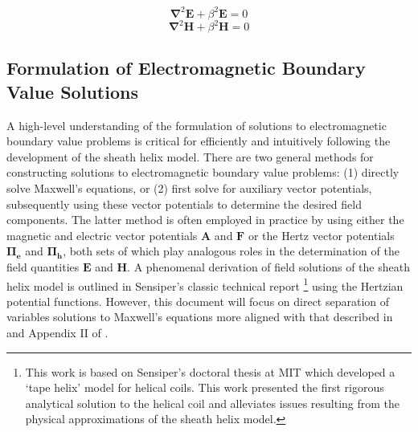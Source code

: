 \begin{equation}\label{eq:EwaveLossless}
	\mathbf{\nabla}^2\mathbf{E} + \beta^2 \mathbf{E} = 0
\end{equation}
\begin{equation}\label{eq:HwaveLossless}
	\mathbf{\nabla}^2\mathbf{H} + \beta^2 \mathbf{H} = 0
\end{equation}

\subsection{Formulation of Electromagnetic Boundary Value Solutions}\label{subsec:bvp}
A high-level understanding of the formulation of solutions to electromagnetic boundary value problems is critical for efficiently and intuitively following the development of the sheath helix model. There are two general methods for constructing solutions to electromagnetic boundary value problems: (1) directly solve Maxwell's equations, or (2) first solve for auxiliary vector potentials, subsequently using these vector potentials to determine the desired field components. The latter method is often employed in practice by using either the magnetic and electric vector potentials $\mathbf{A}$ and $\mathbf{F}$ or the Hertz vector potentials $\mathbf{\Pi_e}$ and $\mathbf{\Pi_h}$, both sets of which play analogous roles in the determination of the field quantities $\mathbf{E}$ and $\mathbf{H}$. A phenomenal derivation of field solutions of the sheath helix model is outlined in Sensiper's classic technical report \cite{sensiper_thesis}\footnote{This work is based on Sensiper's doctoral thesis at MIT which developed a `tape helix' model for helical coils. This work presented the first rigorous analytical solution to the helical coil and alleviates issues resulting from the physical approximations of the sheath helix model.} using the Hertzian potential functions. However, this document will focus on direct separation of variables solutions to Maxwell's equations more aligned with that described in \cite{corum1} and Appendix II of \cite{vizmuller1}. 

